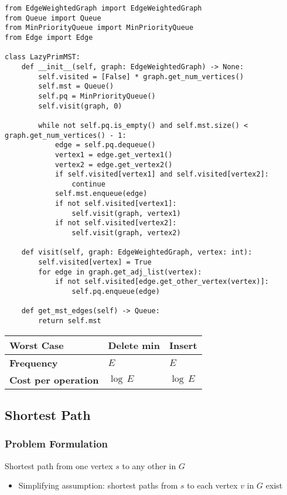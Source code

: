 \documentclass[a4paper]{article}
\begin{document}
\begin{lstlisting}
from EdgeWeightedGraph import EdgeWeightedGraph
from Queue import Queue
from MinPriorityQueue import MinPriorityQueue
from Edge import Edge

class LazyPrimMST:
    def __init__(self, graph: EdgeWeightedGraph) -> None:
        self.visited = [False] * graph.get_num_vertices()
        self.mst = Queue()
        self.pq = MinPriorityQueue()
        self.visit(graph, 0)

        while not self.pq.is_empty() and self.mst.size() < graph.get_num_vertices() - 1:
            edge = self.pq.dequeue()
            vertex1 = edge.get_vertex1()
            vertex2 = edge.get_vertex2()
            if self.visited[vertex1] and self.visited[vertex2]:
                continue
            self.mst.enqueue(edge)
            if not self.visited[vertex1]:
                self.visit(graph, vertex1)
            if not self.visited[vertex2]:
                self.visit(graph, vertex2)

    def visit(self, graph: EdgeWeightedGraph, vertex: int):
        self.visited[vertex] = True
        for edge in graph.get_adj_list(vertex):
            if not self.visited[edge.get_other_vertex(vertex)]:
                self.pq.enqueue(edge)

    def get_mst_edges(self) -> Queue:
        return self.mst
\end{lstlisting}

\begin{spacing}{1.5}
\begin{tabularx}{1\textwidth}{|X|X|X|}
    \hline
    \textbf{\color{blue}Worst Case}&\textbf{Delete min} & \textbf{Insert}\\
    \hline
    \textbf{Frequency}&$E$&$E$\\
    \hline
    \textbf{Cost per operation}&$\log\,E$&$\log\,E$\\
    \hline
\end{tabularx}
\end{spacing}

\subsection{Shortest Path}
\subsubsection*{Problem Formulation}

Shortest path from one vertex $s$ to any other in $G$
\begin{itemize}
    \item Simplifying assumption: shortest paths from $s$ to each vertex $v$ in $G$ exist
\end{itemize}
\end{document}
